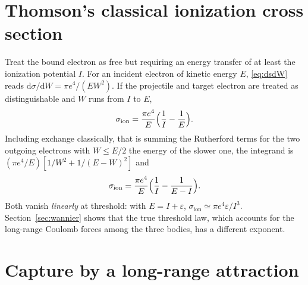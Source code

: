 \documentclass[11pt,a4paper]{book}
\numberwithin{equation}{chapter}
\newcommand{\dd}{\mathrm{d}}
\begin{document}
\section{Thomson's classical ionization cross section}

Treat the bound electron as free but requiring an energy transfer of at least
the ionization potential $I$. For an incident electron of kinetic energy $E$,
\eqref{eq:dsdW} reads $\dd\sigma/\dd W=\pi e^4/(EW^2)$. If the projectile and
target electron are treated as distinguishable and $W$ runs from $I$ to $E$,
\begin{equation}\label{eq:Thomson}
  \sigma_{\mathrm{ion}}=\frac{\pi e^4}{E}\Bigl(\frac1I-\frac1E\Bigr).
\end{equation}
Including exchange classically, that is summing the Rutherford terms for the two
outgoing electrons with $W\le E/2$ the energy of the slower one, the integrand is
$(\pi e^4/E)[1/W^2+1/(E-W)^2]$ and
\begin{equation}\label{eq:Thomson-ex}
  \sigma_{\mathrm{ion}}=\frac{\pi e^4}{E}\Bigl(\frac1I-\frac1{E-I}\Bigr).
\end{equation}
Both vanish \emph{linearly} at threshold: with $E=I+\varepsilon$,
$\sigma_{\mathrm{ion}}\simeq\pi e^4\varepsilon/I^3$. Section~\ref{sec:wannier}
shows that the true threshold law, which accounts for the long-range Coulomb
forces among the three bodies, has a different exponent.

\section{Capture by a long-range attraction}\label{sec:capture}
\end{document}
